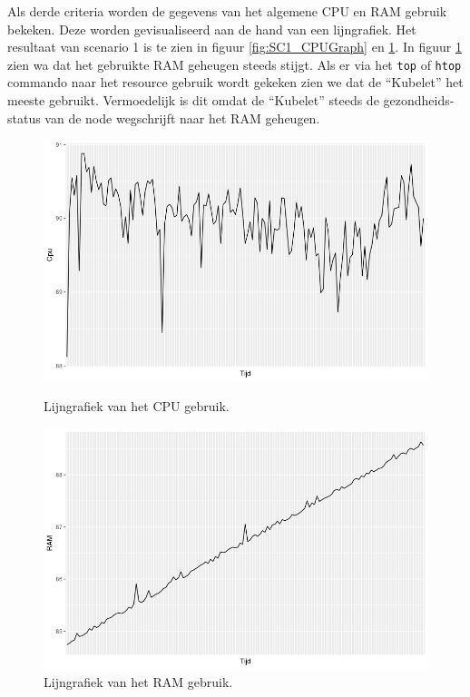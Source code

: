 Als derde criteria worden de gegevens van het algemene CPU en RAM gebruik bekeken. Deze worden gevisualiseerd aan de hand van een lijngrafiek. Het resultaat van scenario 1 is te zien in figuur \ref{fig:SC1_CPUGraph} en \ref{fig:SC1_RAMGraph}. In figuur \ref{fig:SC1_RAMGraph} zien wa dat het gebruikte RAM geheugen steeds stijgt. Als er via het \verb|top| of \verb|htop| commando naar het resource gebruik wordt gekeken zien we dat de ``Kubelet'' het meeste gebruikt. Vermoedelijk is dit omdat de ``Kubelet'' steeds de gezondheids-status van de node wegschrijft naar het RAM geheugen.
\begin{figure}[ht]
	\centering
	\begin{minipage}[b]{0.45\linewidth}
			\includegraphics[width=\linewidth]{img/SC1_CPUGraph.png}
		\caption{Lijngrafiek van het CPU gebruik.}
		\label{fig:SC1_CPUGraph}
	\end{minipage}
	\quad
	\begin{minipage}[b]{0.45\linewidth}
		\includegraphics[width=\linewidth]{img/SC1_RAMGraph.png}
		\caption{Lijngrafiek van het RAM gebruik.}
		\label{fig:SC1_RAMGraph}
	\end{minipage}
\end{figure}
%
%

